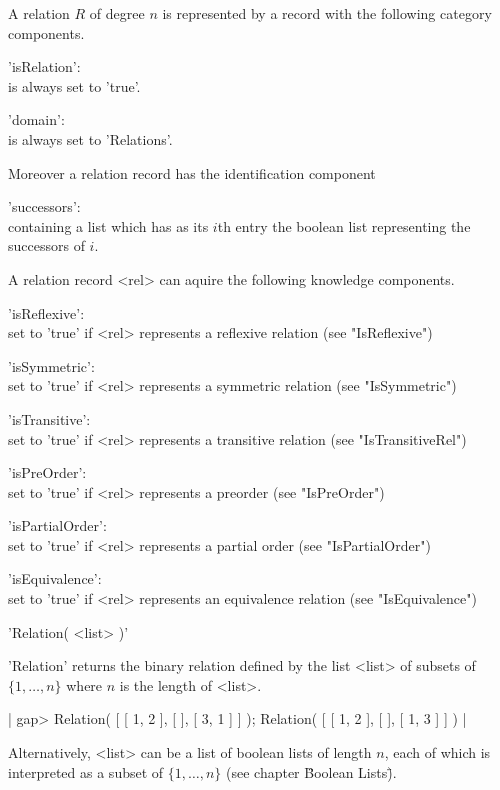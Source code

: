 A  relation  $R$ of degree   $n$  is represented  by  a  record with  the
following category components.

'isRelation': \\
        is always set to 'true'.

'domain': \\
        is always set to 'Relations'.

Moreover a relation record has the identification component

'successors': \\
        containing a list which  has as its $i$th entry the  boolean list
        representing the successors of $i$.

A relation record <rel> can aquire the following knowledge components.

'isReflexive': \\
        set to  'true' if  <rel>  represents a  reflexive  relation  (see 
        "IsReflexive")

'isSymmetric': \\
        set to  'true' if  <rel>  represents a  symmetric  relation  (see 
        "IsSymmetric")

'isTransitive': \\
        set to  'true' if  <rel>  represents a  transitive relation  (see 
        "IsTransitiveRel")
        
'isPreOrder': \\
        set to 'true' if <rel> represents a preorder (see "IsPreOrder")

'isPartialOrder': \\
        set   to   'true'  if  <rel>   represents a   partial  order (see
        "IsPartialOrder")

'isEquivalence': \\
        set to 'true' if   <rel> represents an equivalence relation  (see
        "IsEquivalence")


'Relation( <list> )'

'Relation' returns the binary  relation  defined by  the list <list>   of
subsets of $\{1, \dots, n\}$ where $n$ is the length of <list>.

|    gap> Relation( [ [ 1, 2 ], [ ], [ 3, 1 ] ] );
    Relation( [ [ 1, 2 ], [  ], [ 1, 3 ] ] ) |

Alternatively, <list> can be a list of boolean lists  of length $n$, each
of which  is interpreted as  a subset  of $\{1, \dots,  n\}$ (see chapter
\"Boolean Lists\").

